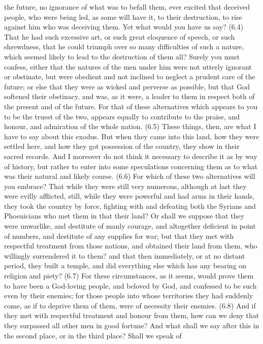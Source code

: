 the future, no ignorance of what was to befall them, ever excited that deceived people, who were being
led, as some will have it, to their destruction, to rise against him who was deceiving them. Yet what
would you have us say? (6.4) That he had such excessive art, or such great eloquence of speech, or such
shrewdness, that he could triumph over so many difficulties of such a nature, which seemed likely to
lead to the destruction of them all? Surely you must confess, either that the natures of the men under
him were not utterly ignorant or obstinate, but were obedient and not inclined to neglect a prudent care
of the future; or else that they were as wicked and perverse as possible, but that God softened their
obstinacy, and was, as it were, a leader to them in respect both of the present and of the future. For that
of these alternatives which appears to you to be the truest of the two, appears equally to contribute to
the praise, and honour, and admiration of the whole nation. (6.5) These things, then, are what I have to
say about this exodus. But when they came into this land, how they were settled here, and how they got
possession of the country, they show in their sacred records. And I moreover do not think it necessary to
describe it as by way of history, but rather to enter into some speculations concerning them as to what
was their natural and likely course. (6.6) For which of these two alternatives will you embrace? That
while they were still very numerous, although at last they were evilly afflicted, still, while they were
powerful and had arms in their hands, they took the country by force, fighting with and defeating both
the Syrians and Phoenicians who met them in that their land? Or shall we suppose that they were
unwarlike, and destitute of manly courage, and altogether deficient in point of numbers, and destitute of
any supplies for war; but that they met with respectful treatment from those nations, and obtained their
land from them, who willingly surrendered it to them? and that then immediately, or at no distant
period, they built a temple, and did everything else which has any bearing on religion and piety? (6.7)
For these circumstances, as it seems, would prove them to have been a God-loving people, and beloved
by God, and confessed to be such even by their enemies; for those people into whose territories they had
suddenly come, as if to deprive them of them, were of necessity their enemies. (6.8) And if they met with
respectful treatment and honour from them, how can we deny that they surpassed all other men in good
fortune? And what shall we say after this in the second place, or in the third place? Shall we speak of
